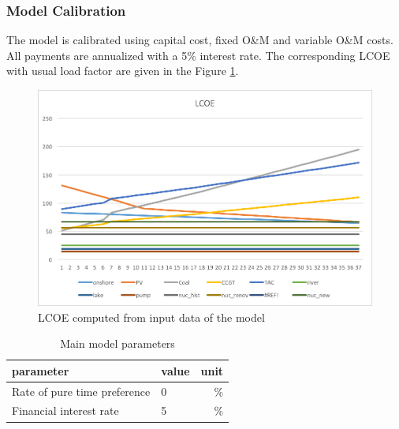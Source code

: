 
\clearpage

\subsubsection{Model Calibration}

\label{app:calibration}

The model is calibrated using capital cost, fixed O\&M and variable O\&M costs. All payments are annualized with a 5\% interest rate. The corresponding LCOE with usual load factor are given in the Figure \ref{fig:calibration_LCOE}.

\begin{figure}[!ht]
	\centering
	\includegraphics[width=12cm]{figures/calibration_LCOE.png}
	\caption{LCOE computed from input data of the model}
	\label{fig:calibration_LCOE}
\end{figure}

\begin{table}[!ht]
	\centering
	\caption{Main model parameters}
	\begin{tabular}{llr}
		\toprule
		parameter&value&unit\\
		\midrule
		Rate of pure time preference &0&\%\\
		Financial interest rate&5&\%\\
		\bottomrule
	\end{tabular}
\end{table}

